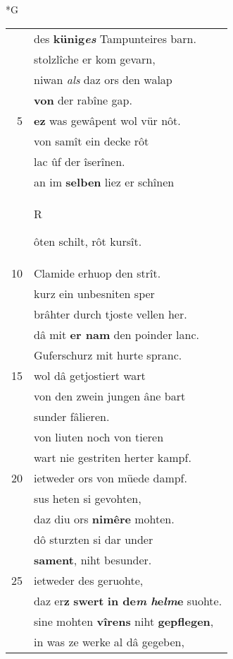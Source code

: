 \documentclass[8pt,a4paper,notitlepage]{article}
\begin{document}
\begin{table}[ht]
\begin{minipage}[t]{0.5\linewidth}
\small
\begin{center}*G
\end{center}
\begin{tabular}{rl}
 & des \textbf{künig\textit{es}} Tampunteires barn.\\ 
 & stolzlîche er kom gevarn,\\ 
 & niwan \textit{als} daz ors den walap\\ 
 & \textbf{von} der rabîne gap.\\ 
5 & \textbf{ez} was gewâpent wol vür nôt.\\ 
 & von samît ein decke rôt\\ 
 & lac ûf der îserînen.\\ 
 & an im \textbf{selben} liez er schînen\\ 
 & \begin{large}R\end{large}ôten schilt, rôt kursît.\\ 
10 & Clamide erhuop den strît.\\ 
 & kurz ein unbesniten sper\\ 
 & brâhter durch tjoste vellen her.\\ 
 & dâ mit \textbf{er nam} den poinder lanc.\\ 
 & Guferschurz mit hurte spranc.\\ 
15 & wol dâ getjostiert wart\\ 
 & von den zwein jungen âne bart\\ 
 & sunder fâlieren.\\ 
 & von liuten noch von tieren\\ 
 & wart nie gestriten herter kampf.\\ 
20 & ietweder ors von müede dampf.\\ 
 & sus heten si gevohten,\\ 
 & daz diu ors \textbf{nimêre} mohten.\\ 
 & dô sturzten si dar under\\ 
 & \textbf{sament}, niht besunder.\\ 
25 & ietweder des geruohte,\\ 
 & daz er\textbf{z} \textbf{swert} \textbf{in de\textit{m} \textit{h}e\textit{lm}e} suohte.\\ 
 & sine mohten \textbf{vîrens} niht \textbf{gepflegen},\\ 
 & in was ze werke al dâ gegeben,\\ 

\end{tabular}
\end{minipage}
\end{table}
\end{document}
